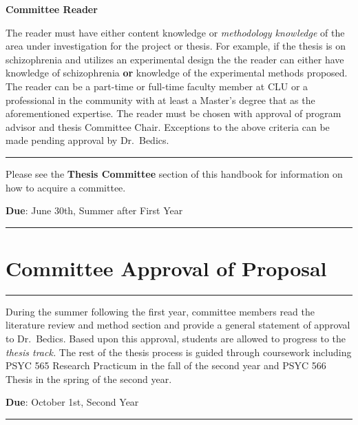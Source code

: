 \documentclass[openany]{book}
\begin{document}
\textbf{Committee Reader}

The reader must have either content knowledge or \emph{methodology knowledge} of the area under investigation for the project or thesis. For example, if the thesis is on schizophrenia and utilizes an experimental design the the reader can either have knowledge of schizophrenia \textbf{or} knowledge of the experimental methods proposed. The reader can be a part-time or full-time faculty member at CLU or a professional in the community with at least a Master's degree that as the aforementioned expertise. The reader must be chosen with approval of program advisor and thesis Committee Chair. Exceptions to the above criteria can be made pending approval by Dr.~Bedics.

\begin{center}\rule{0.5\linewidth}{0.5pt}\end{center}

Please see the \textbf{Thesis Committee} section of this handbook for information on how to acquire a committee.

\textbf{Due}: June 30th, Summer after First Year

\begin{center}\rule{0.5\linewidth}{0.5pt}\end{center}

\hypertarget{committee-approval-of-proposal}{%
\section{Committee Approval of Proposal}\label{committee-approval-of-proposal}}

\begin{center}\rule{0.5\linewidth}{0.5pt}\end{center}

During the summer following the first year, committee members read the literature review and method section and provide a general statement of approval to Dr.~Bedics. Based upon this approval, students are allowed to progress to the \emph{thesis track.} The rest of the thesis process is guided through coursework including PSYC 565 Research Practicum in the fall of the second year and PSYC 566 Thesis in the spring of the second year.

\textbf{Due}: October 1st, Second Year

\begin{center}\rule{0.5\linewidth}{0.5pt}\end{center}
\end{document}
